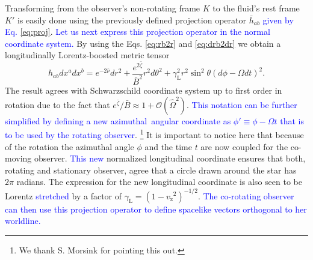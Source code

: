 \documentclass{aa}
\newcommand{\be}{\begin{equation}}
\newcommand{\ee}{\end{equation}}
\newcommand{\refe}[1]{\textcolor{blue}{{#1}}}
\newcommand{\sch}{Schwarzschild }
\newcommand{\rb}{\ensuremath{\bar{r}}}
\newcommand{\Ob}{\ensuremath{\hat{\Omega}}}
\newcommand{\nub}{\ensuremath{\bar{\nu}}}
\newcommand{\zetab}{\ensuremath{\bar{\zeta}}}
\newcommand{\Bb}{\ensuremath{\bar{B}}}
\newcommand{\vz}{\ensuremath{v_{\mathrm{z}}}}
\newcommand{\lgamma}{\gamma_{\text{L}}}
\begin{document}
Transforming from the observer's non-rotating frame $K$ to the fluid's rest frame $K'$ is easily done using the previously defined projection operator $\bar{h}_{ab}$ \refe{given by Eq. \eqref{eq:proj}}.
\refe{Let us next express this projection operator in the normal coordinate system.}
By using the Eqs. \eqref{eq:rb2r} and \eqref{eq:drb2dr} we obtain a longitudinally Lorentz-boosted metric tensor 
\be \label{eq:gammaSch} 
h_{ab} dx^a dx^b = e^{-2\nub}dr^2 + \frac{e^{2\zetab}}{\Bb^2} r^2 d\theta^2 + \lgamma^2 r^2 \sin^2\theta (d\phi - \Omega dt)^2.
\ee 
The result agrees with \sch coordinate system up to first order in rotation due to the fact that $e^{\zetab}/\Bb \approx 1 + \mathcal{O}(\Ob^2)$.  
\refe{This notation can be further simplified by defining a new azimuthal angular coordinate as $\phi' \equiv \phi - \Omega t$ that is to be used by the rotating observer}.%
\footnote{We thank S. Morsink for pointing this out.}
It is important to notice here that because of the rotation the azimuthal angle $\phi$ and the time $t$ are now coupled for the co-moving observer.
\refe{This new} normalized longitudinal coordinate ensures that both, rotating and stationary observer, agree that a circle drawn around the star has $2\pi$ radians.
The expression for the new longitudinal coordinate is also seen to be Lorentz \refe{stretched} by a factor of $\lgamma = (1-\vz^2)^{-1/2}$.
\refe{The co-rotating observer can then use this projection operator to define spacelike vectors orthogonal to her worldline.}
\end{document}
